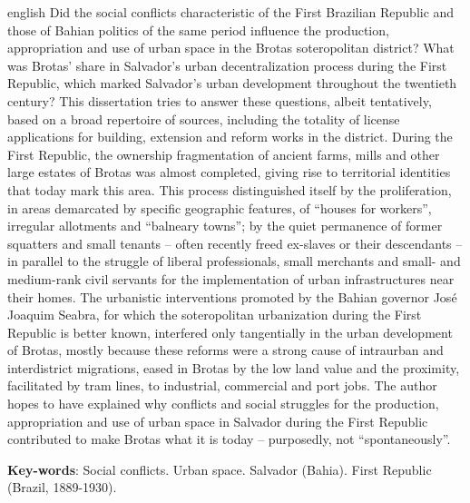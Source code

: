 \begin{resumo}[Abstract]
 \begin{otherlanguage*}{english}
Did the social conflicts characteristic of the First Brazilian Republic and those of Bahian politics of the same period influence the production, appropriation and use of urban space in the Brotas soteropolitan district? What was Brotas' share in Salvador's urban decentralization process during the First Republic, which marked Salvador's urban development throughout the twentieth century? This dissertation tries to answer these questions, albeit tentatively, based on a broad repertoire of sources, including the totality of license applications for building, extension and reform works in the district. During the First Republic, the ownership fragmentation of ancient farms, mills and other large estates of Brotas was almost completed, giving rise to territorial identities that today mark this area. This process distinguished itself by the proliferation, in areas demarcated by specific geographic features, of ``houses for workers'', irregular allotments and ``balneary towns''; by the quiet permanence of former squatters and small tenants -- often recently freed ex-slaves or their descendants -- in parallel to the struggle of liberal professionals, small merchants and small- and medium-rank civil servants for the implementation of urban infrastructures near their homes. The urbanistic interventions promoted by the Bahian governor José Joaquim Seabra, for which the soteropolitan urbanization during the First Republic is better known, interfered only tangentially in the urban development of Brotas, mostly because these reforms were a strong cause of intraurban and interdistrict migrations, eased in Brotas by the low land value and the proximity, facilitated by tram lines, to industrial, commercial and port jobs. The author hopes to have explained why conflicts and social struggles for the production, appropriation and use of urban space in Salvador during the First Republic contributed to make Brotas what it is today -- purposedly, not ``spontaneously''.

   \vspace{\onelineskip}
 
   \noindent 
   \textbf{Key-words}: Social conflicts. Urban space. Salvador (Bahia). First Republic (Brazil, 1889-1930).
 \end{otherlanguage*}
\end{resumo}

% 

